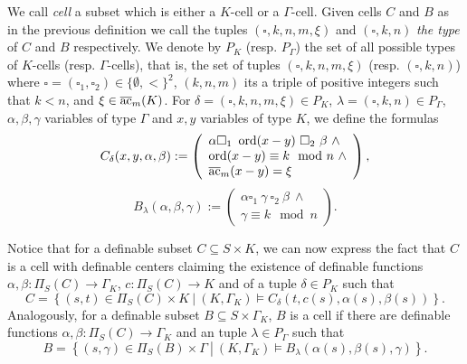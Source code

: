 We call \emph{cell} a subset which is either a $K$-cell or a $\Gamma$-cell. Given cells $C$ and $B$ as in the previous definition we call the tuples $(\square,k,n,m,\xi)$ and $(\square,k,n)$ \emph{the type} of $C$ and $B$ respectively. We denote by $P_K$ (resp. $P_\Gamma$) the set of all possible types of $K$-cells (resp. $\Gamma$-cells), that is, the set of tuples $(\square,k,n,m,\xi)$  (resp. $(\square,k,n)$) where $\square = (\square_1, \square_2) \in \{\emptyset, <\}^{2}$, $(k,n,m)$ its a triple of positive integers such that $k<n$, and $\xi\in {\overline{\rm ac}}_{m}(K)$. For $\delta=(\square,k,n,m,\xi)\in P_K$, $\lambda=(\square,k,n)\in P_{\Gamma}$, $\alpha,\beta,\gamma$ variables of type $\Gamma$ and $x,y$ variables of type $K$, we define the formulas
\begin{equation}\label{defKcells}
C_\delta(x,y,\alpha,\beta):= \left(\begin{array}{l} \alpha \square_1 \ \ord(x-y) \ \square_2 \ \beta \ \wedge\\ \ord(x-y) \equiv k\mod n \ \wedge\\ \ac_{m}(x-y) = \xi \end{array} \right),
\end{equation}
\begin{equation}\label{defGammacells}
B_\lambda(\alpha,\beta,\gamma):= \left(\begin{array}{l} \alpha \square_1 \ \gamma \ \square_2 \ \beta \ \wedge \\
\gamma \equiv k\mod n \end{array}\right).
\end{equation}

Notice that for a definable subset $C\subseteq S\times K$, we can now express the fact that $C$ is a cell with definable centers claiming the existence of definable functions $\alpha,\beta:\Pi_S(C)\to\Gamma_K$, $c:\Pi_S(C)\to K$ and of a tuple $\delta\in P_K$ such that 
\[C = \left\{(s,t) \in \Pi_S(C)\times K \ \left| \ (K,\Gamma_K)\models C_\delta(t,c(s),\alpha(s),\beta(s))\right\}\right..
\]
Analogously, for a definable subset $B\subseteq S\times \Gamma_K$, $B$ is a cell if there are definable functions $\alpha,\beta:\Pi_S(C)\to\Gamma_K$ and an tuple $\lambda\in P_\Gamma$ such that  
\[B = \left\{(s,\gamma) \in \Pi_S(B) \times \Gamma \ \left| \ (K,\Gamma_K)\models B_\lambda(\alpha(s),\beta(s),\gamma)\right\}\right..
\]



